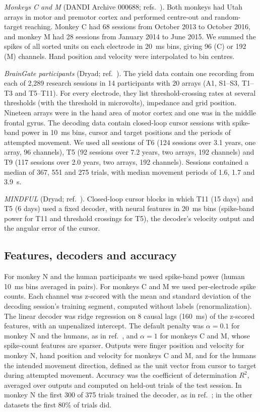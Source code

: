 \documentclass[pdflatex,sn-nature]{sn-jnl}
\begin{document}
\textit{Monkeys C and M} (DANDI Archive 000688\cite{data_perich}; refs.~\cite{gallego2020,perich2018}). Both monkeys had
Utah arrays in motor and premotor cortex and performed centre-out and random-target reaching. Monkey C had 68 sessions
from October 2013 to October 2016, and monkey M had 28 sessions from January 2014 to June 2015. We summed the spikes of
all sorted units on each electrode in 20~ms bins, giving 96 (C) or 192 (M) channels. Hand position and velocity were
interpolated to bin centres.

\textit{BrainGate participants} (Dryad\cite{data_braingate}; ref.~\cite{hahn2026}). The yield data contain one recording
from each of 2,289 research sessions in 14 participants with 20 arrays (A1, S1--S3, T1--T3 and T5--T11). For every
electrode, they list threshold-crossing rates at several thresholds (with the threshold in microvolts), impedance and
grid position. Nineteen arrays were in the hand area of motor cortex and one was in the middle frontal gyrus. The
decoding data contain closed-loop cursor sessions with spike-band power in 10~ms bins, cursor and target positions and
the periods of attempted movement. We used all sessions of T6 (124 sessions over 3.1 years, one array, 96 channels), T5
(92 sessions over 7.2 years, two arrays, 192 channels) and T9 (117 sessions over 2.0 years, two arrays, 192 channels).
Sessions contained a median of 367, 551 and 275 trials, with median movement periods of 1.6, 1.7 and 3.9~s.

\textit{MINDFUL} (Dryad\cite{data_mindful}; ref.~\cite{pun2024}). Closed-loop cursor blocks in which T11 (15 days) and T5
(6 days) used a fixed decoder, with neural features in 20~ms bins (spike-band power for T11 and threshold crossings for
T5), the decoder's velocity output and the angular error of the cursor.

\subsection*{Features, decoders and accuracy}

For monkey N and the human participants we used spike-band power (human 10~ms bins averaged in pairs). For monkeys C and
M we used per-electrode spike counts. Each channel was z-scored with the mean and standard deviation of the decoding
session's training segment, computed without labels (renormalization). The linear decoder was ridge
regression\cite{hoerl1970} on 8 causal lags (160~ms) of the z-scored features, with an unpenalized intercept. The default
penalty was $\alpha = 0.1$ for monkey N and the humans, as in ref.~\cite{temmar2025}, and $\alpha = 1$ for monkeys C and
M, whose spike-count features are sparser. Outputs were finger position and velocity for monkey N, hand position and
velocity for monkeys C and M, and for the humans the intended movement direction, defined as the unit vector from cursor
to target during attempted movement. Accuracy was the coefficient of determination $R^2$, averaged over outputs and
computed on held-out trials of the test session. In monkey N the first 300 of 375 trials trained the decoder, as in
ref.~\cite{temmar2025}; in the other datasets the first 80\% of trials did.
\end{document}
